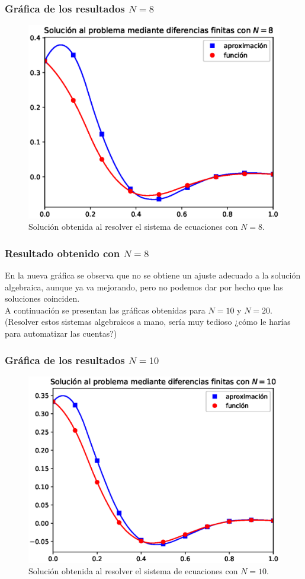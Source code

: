 \begin{frame}
\frametitle{Gráfica de los resultados $N=8$}
\begin{figure}[h!]
    \centering
    \includegraphics[scale=0.5]{Imagenes/metodo_diferencias_finitas_04.eps}
    \caption{Solución obtenida al resolver el sistema de ecuaciones con $N=8$.}
\end{figure}
\end{frame}
\begin{frame}
\frametitle{Resultado obtenido con $N=8$}
En la nueva gráfica se observa que no se obtiene un ajuste adecuado a la solución algebraica, aunque ya va mejorando, pero no podemos dar por hecho que las soluciones coinciden.
\\
\bigskip
\pause
A continuación se presentan las gráficas obtenidas para $N=10$ y $N=20$. (Resolver estos sistemas algebraicos a mano, sería muy tedioso ¿cómo le harías para automatizar las cuentas?)
\end{frame}
\begin{frame}
\frametitle{Gráfica de los resultados $N=10$}
\begin{figure}[h!]
    \centering
    \includegraphics[scale=0.5]{Imagenes/metodo_diferencias_finitas_05.eps}
    \caption{Solución obtenida al resolver el sistema de ecuaciones con $N=10$.}
\end{figure}
\end{frame}
